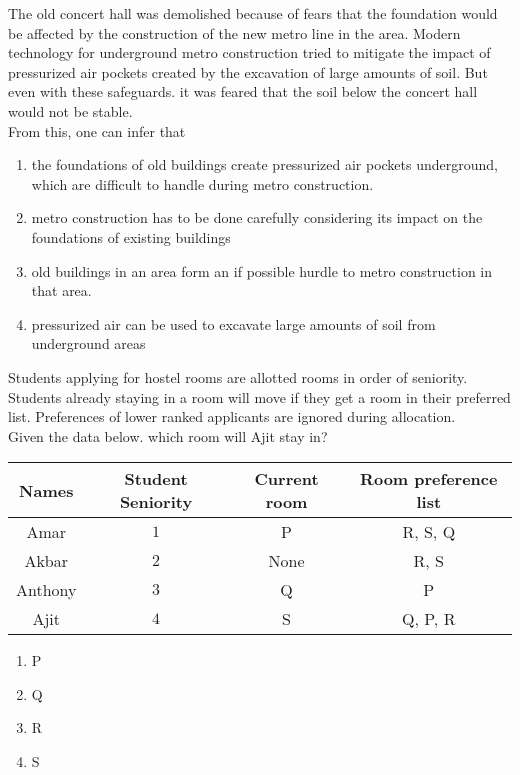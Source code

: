     \item The old concert hall was demolished because of fears that the foundation would be affected by the construction of the new metro line in the area. Modern technology for underground metro construction tried to mitigate the impact of pressurized air pockets created by the excavation of large amounts of soil. But even with these safeguards. it was feared that the soil below the concert hall would not be stable.\\
    From this, one can infer that
    \begin{enumerate}
        \item the foundations of old buildings create pressurized air pockets underground, which are difficult to handle during metro construction.
        \item metro construction has to be done carefully considering its impact on the foundations of existing buildings
        \item old buildings in an area form an if possible hurdle to metro construction in that area.
        \item pressurized air can be used to excavate large amounts of soil from underground areas
    \end{enumerate}

    \item Students applying for hostel rooms are allotted rooms in order of seniority. Students already staying in a room will move if they get a room in their preferred list. Preferences of lower ranked applicants are ignored during allocation.\\
    Given the data below. which room will Ajit stay in?
    \begin{table}[h!]
    \centering
    \begin{tabular}{|c|c|c|c|}
        \hline
        Names & Student Seniority & Current room & Room preference list \\ \hline
        Amar & $1$ & P & R, S, Q  \\ \hline
        Akbar & $2$ & None & R, S\\ \hline
        Anthony & $3$ & Q & P \\ \hline
        Ajit & $4$ & S & Q, P, R\\ \hline
    \end{tabular}
    \end{table}

    \begin{multicols}{4}
        \begin{enumerate}
            \item P
            \item Q
            \item R
            \item S
        \end{enumerate}
    \end{multicols}

